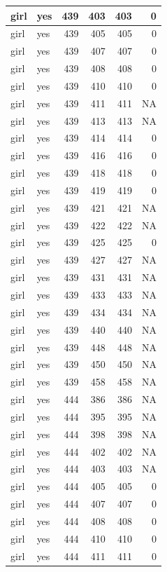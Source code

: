\documentclass[man]{apa6}
\begin{document}
\begin{tabular}{l|l|r|r|r|r}
\hline
girl & yes & 439 & 403 & 403 & 0\\
\hline
girl & yes & 439 & 405 & 405 & 0\\
\hline
girl & yes & 439 & 407 & 407 & 0\\
\hline
girl & yes & 439 & 408 & 408 & 0\\
\hline
girl & yes & 439 & 410 & 410 & 0\\
\hline
girl & yes & 439 & 411 & 411 & NA\\
\hline
girl & yes & 439 & 413 & 413 & NA\\
\hline
girl & yes & 439 & 414 & 414 & 0\\
\hline
girl & yes & 439 & 416 & 416 & 0\\
\hline
girl & yes & 439 & 418 & 418 & 0\\
\hline
girl & yes & 439 & 419 & 419 & 0\\
\hline
girl & yes & 439 & 421 & 421 & NA\\
\hline
girl & yes & 439 & 422 & 422 & NA\\
\hline
girl & yes & 439 & 425 & 425 & 0\\
\hline
girl & yes & 439 & 427 & 427 & NA\\
\hline
girl & yes & 439 & 431 & 431 & NA\\
\hline
girl & yes & 439 & 433 & 433 & NA\\
\hline
girl & yes & 439 & 434 & 434 & NA\\
\hline
girl & yes & 439 & 440 & 440 & NA\\
\hline
girl & yes & 439 & 448 & 448 & NA\\
\hline
girl & yes & 439 & 450 & 450 & NA\\
\hline
girl & yes & 439 & 458 & 458 & NA\\
\hline
girl & yes & 444 & 386 & 386 & NA\\
\hline
girl & yes & 444 & 395 & 395 & NA\\
\hline
girl & yes & 444 & 398 & 398 & NA\\
\hline
girl & yes & 444 & 402 & 402 & NA\\
\hline
girl & yes & 444 & 403 & 403 & NA\\
\hline
girl & yes & 444 & 405 & 405 & 0\\
\hline
girl & yes & 444 & 407 & 407 & 0\\
\hline
girl & yes & 444 & 408 & 408 & 0\\
\hline
girl & yes & 444 & 410 & 410 & 0\\
\hline
girl & yes & 444 & 411 & 411 & 0\\

\end{tabular}
\end{document}
